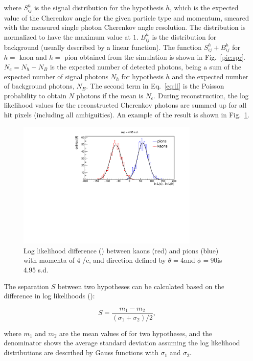 \noindent where $S^{h}_{ij}$ is the signal distribution for the hypothesis $h$, which is the expected value of the Cherenkov angle for the given particle type and momentum, smeared with the measured single photon Cherenkov angle resolution. The distribution is normalized to have the maximum value at $1$. $B^{h}_{ij}$ is the distribution for background (usually described by a linear function). The function $S^{h}_{ij} + B^{h}_{ij}$ for $h = $ kaon and $h = $ pion obtained from the simulation is shown in Fig.~\ref{pic:spr}. $N_{e} = N_{h} + N_{B}$ is the expected number of detected photons, being a sum of the expected number of signal photons $N_{h}$ for hypothesis $h$ and the expected number of background photons, $N_{B}$. The second term in Eq.~\ref{eq:ll} is the Poisson probability to obtain $N$ photons if the mean is $N_{e}$.
During reconstruction, the log likelihood values for the reconstructed Cherenkov photons are summed up for all hit pixels (including all ambiguities). An example of the result is shown in Fig.~\ref{pic:sepLUT}.

\begin{figure}[!h]
\centering
\includegraphics[clip, trim=0cm 0cm 0cm 0.7cm, width=0.8\textwidth]{pics/hLnDiff.pdf}
\caption{\label{pic:sepLUT}
Log likelihood difference (\deltall) between kaons (red) and pions (blue) with momenta of $4$ {\gev}/c, and direction defined by $\theta = 4$\mydeg and $\phi = 90$\mydeg is 4.95 s.d.
}
\end{figure}

The separation $S$ between two hypotheses can be calculated based on the difference in log likelihoods (\deltall):

\begin{equation}
S = \frac{m_{1}-m_{2}}{(\sigma_{1} + \sigma_{2})/2},
\end{equation}

\noindent where $m_{1}$ and $m_{2}$ are the mean values of \deltall for two hypotheses, and the denominator shows the average standard deviation assuming the log likelihood distributions are described by Gauss functions with $\sigma_{1}$ and $\sigma_{2}$.